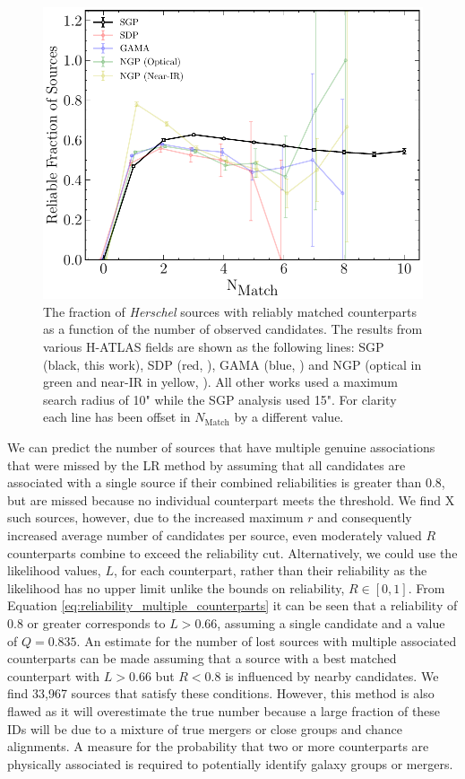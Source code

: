 \begin{figure}
    \centering
    \includegraphics[width=0.75\columnwidth]{Figures/multiplicity.pdf}
    \caption{The fraction of \textit{Herschel} sources with reliably matched counterparts as a function of the number of observed candidates. The results from various H-ATLAS fields are shown as the following lines: SGP (black, this work), SDP (red, \citealt{Smith_2011}), GAMA (blue, \citealt{Bourne_2016}) and NGP (optical in green and near-IR in yellow, \citealt{Furlanetto_2018}). All other works used a maximum search radius of 10" while the SGP analysis used 15". For clarity each line has been offset in $N_{\textrm{Match}}$ by a different value.}
    \label{fig:multiplicity}
\end{figure}

We can predict the number of sources that have multiple genuine associations that were missed by the LR method by assuming that all candidates are associated with a single source if their combined reliabilities is greater than 0.8, but are missed because no individual counterpart meets the threshold. We find {\color{red} X} such sources, however, due to the increased maximum $r$ and consequently increased average number of candidates per source, even moderately valued $R$ counterparts combine to exceed the reliability cut. Alternatively, we could use the likelihood values, $L$, for each counterpart, rather than their reliability as the likelihood has no upper limit unlike the bounds on reliability, $R \in [0, 1]$. From Equation \ref{eq:reliability_multiple_counterparts} it can be seen that a reliability of 0.8 or greater corresponds to $L > 0.66$, assuming a single candidate and a value of $Q = 0.835$. An estimate for the number of lost sources with multiple associated counterparts can be made assuming that a source with a best matched counterpart with $L > 0.66$ but $R < 0.8$ is influenced by nearby candidates. We find 33,967 sources that satisfy these conditions. However, this method is also flawed as it will overestimate the true number because a large fraction of these IDs will be due to a mixture of true mergers or close groups and chance alignments. A measure for the probability that two or more counterparts are physically associated is required to potentially identify galaxy groups or mergers.

